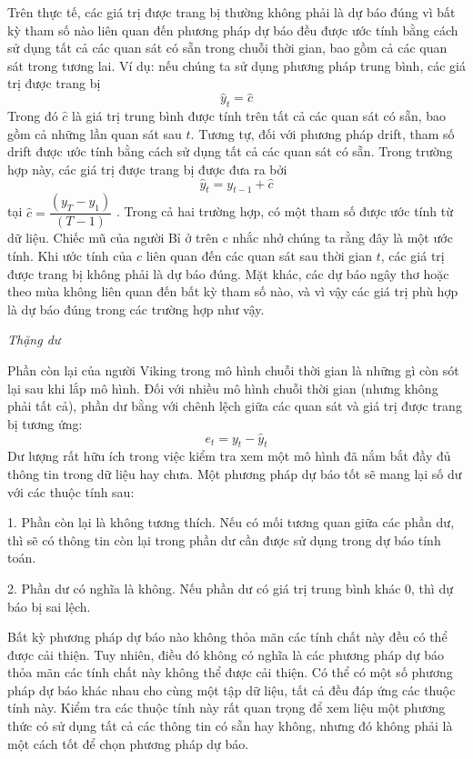 \documentclass[12pt, a4paper,oneside]{book}
\theoremstyle{definition}
\begin{document}
Trên thực tế, các giá trị được trang bị thường không phải là dự báo đúng vì bất kỳ tham số nào liên quan đến phương pháp dự báo đều được ước tính bằng cách sử dụng tất cả các quan sát có sẵn trong chuỗi thời gian, bao gồm cả các quan sát trong tương lai. Ví dụ: nếu chúng ta sử dụng phương pháp trung bình, các giá trị được trang bị $$\hat{y}_{t}=\hat{c}$$
Trong đó $\hat{c}$ là giá trị trung bình được tính trên tất cả các quan sát có sẵn, bao gồm cả những lần quan sát sau $t$. Tương tự, đối với phương pháp drift, tham số drift được ước tính bằng cách sử dụng tất cả các quan sát có sẵn. Trong trường hợp này, các giá trị được trang bị được đưa ra bởi $$\hat{y}_{t}=y_{t-1}+\hat{c}$$ tại $\hat{c}=\dfrac{(y_{T}-y_{1})}{(T-1)}$ . Trong cả hai trường hợp, có một tham số được ước tính từ dữ liệu. Chiếc mũ của người Bỉ ở trên c nhắc nhở chúng ta rằng đây là một ước tính. Khi ước tính của $c$ liên quan đến các quan sát sau thời gian $t$, các giá trị được trang bị không phải là dự báo đúng. Mặt khác, các dự báo ngây thơ hoặc theo mùa không liên quan đến bất kỳ tham số nào, và vì vậy các giá trị phù hợp là dự báo đúng trong các trường hợp như vậy.

\textit{Thặng dư}

Phần còn lại của người Viking trong mô hình chuỗi thời gian là những gì còn sót lại sau khi lắp mô hình. Đối với nhiều mô hình chuỗi thời gian (nhưng không phải tất cả), phần dư bằng với chênh lệch giữa các quan sát và giá trị được trang bị tương ứng: $$e_{t}=y_{t}-\hat{y}_{t}$$
Dư lượng rất hữu ích trong việc kiểm tra xem một mô hình đã nắm bắt đầy đủ thông tin trong dữ liệu hay chưa. Một phương pháp dự báo tốt sẽ mang lại số dư với các thuộc tính sau:

1.	Phần còn lại là không tương thích. Nếu có mối tương quan giữa các phần dư, thì sẽ có thông tin còn lại trong phần dư cần được sử dụng trong dự báo tính toán.

2.	Phần dư có nghĩa là không. Nếu phần dư có giá trị trung bình khác 0, thì dự báo bị sai lệch.

Bất kỳ phương pháp dự báo nào không thỏa mãn các tính chất này đều có thể được cải thiện. Tuy nhiên, điều đó không có nghĩa là các phương pháp dự báo thỏa mãn các tính chất này không thể được cải thiện. Có thể có một số phương pháp dự báo khác nhau cho cùng một tập dữ liệu, tất cả đều đáp ứng các thuộc tính này. Kiểm tra các thuộc tính này rất quan trọng để xem liệu một phương thức có sử dụng tất cả các thông tin có sẵn hay không, nhưng đó không phải là một cách tốt để chọn phương pháp dự báo.
\end{document}
